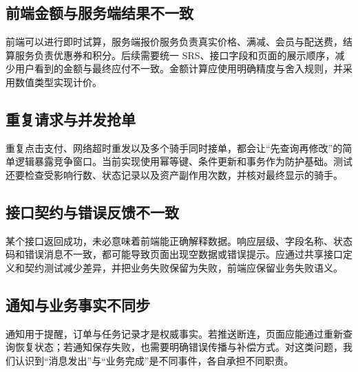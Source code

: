 \subsection{前端金额与服务端结果不一致}
前端可以进行即时试算，服务端报价服务负责真实价格、满减、会员与配送费，结算服务负责优惠券和积分。后续需要统一 SRS、接口字段和页面的展示顺序，减少用户看到的金额与最终应付不一致。金额计算应使用明确精度与舍入规则，并采用数值类型实现计价。
\subsection{重复请求与并发抢单}
重复点击支付、网络超时重发以及多个骑手同时接单，都会让“先查询再修改”的简单逻辑暴露竞争窗口。当前实现使用幂等键、条件更新和事务作为防护基础。测试还要检查受影响行数、状态记录以及资产副作用次数，并核对最终显示的骑手。
\subsection{接口契约与错误反馈不一致}
某个接口返回成功，未必意味着前端能正确解释数据。响应层级、字段名称、状态码和错误消息不一致，都可能导致页面出现空数据或错误提示。应通过共享接口定义和契约测试减少差异，并把业务失败保留为失败，前端应保留业务失败语义。
\subsection{通知与业务事实不同步}
通知用于提醒，订单与任务记录才是权威事实。若推送断连，页面应能通过重新查询恢复状态；若通知保存失败，也需要明确错误传播与补偿方式。对这类问题，我们认识到“消息发出”与“业务完成”是不同事件，各自承担不同职责。

